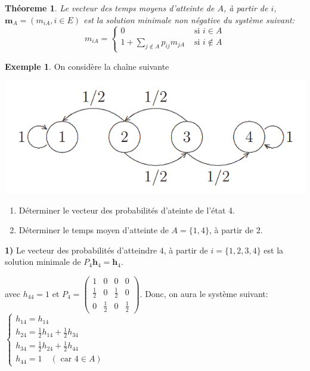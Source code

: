 \documentclass[
]{book}
\providecommand{\tightlist}{%
  \setlength{\itemsep}{0pt}\setlength{\parskip}{0pt}}
\newtheorem{theorem}{Théoreme}[chapter]
\theoremstyle{definition}
\theoremstyle{definition}
\newtheorem{example}{Exemple}[chapter]
\theoremstyle{definition}
\theoremstyle{remark}
\begin{document}
\begin{theorem}
\protect\hypertarget{thm:unnamed-chunk-70}{}{\label{thm:unnamed-chunk-70} }Le vecteur des temps moyens d'atteinte de \(A\), à partir de \(i\), \(\mathbf{m}_A=(m_{iA}, i \in E)\) est la solution minimale non négative du système suivant:
\[
m_{iA}=\left\{
\begin{array}{ll}
0 & \text{ si } i \in A\\
1+\displaystyle \sum_{j \notin A}p_{ij}m_{jA} & \text{ si } i \notin A
\end{array}
\right.
\]
\end{theorem}

\begin{example}
\protect\hypertarget{exm:unnamed-chunk-71}{}{\label{exm:unnamed-chunk-71} }On considère la chaîne suivante
\end{example}

\begin{center}\includegraphics[width=0.45\linewidth]{images/graphe3} \end{center}

\begin{enumerate}
\def\labelenumi{\arabic{enumi})}
\tightlist
\item
  Déterminer le vecteur des probabilités d'ateinte de l'état 4.
\item
  Déterminer le temps moyen d'atteinte de \(A=\{1,4\}\), à partir de \(2\).
\end{enumerate}

\textbf{1)} Le vecteur des probabilités d'atteindre \(4\), à partir de \(i=\{1,2,3,4\}\) est la solution minimale de
\(P_4\mathbf{h}_4=\mathbf{h}_4\).

avec \(h_{44}=1\) et \(P_4=\left(\begin{array}{cccc} 1 & 0 & 0 & 0\\ \frac{1}{2} & 0 & \frac{1}{2} & 0 \\ 0 & \frac{1}{2} & 0 & \frac{1}{2} \end{array}\right)\). Donc, on aura le système suivant:
\(\left\{\begin{array}{l} h_{14}= h_{14} \\ h_{24}=\frac{1}{2} h_{14}+\frac{1}{2} h_{34}\\ h_{34}=\frac{1}{2} h_{24}+\frac{1}{2} h_{44}\\ h_{44}=1 \quad (\text{ car } 4 \in A) \end{array} \right.\)
\end{document}
